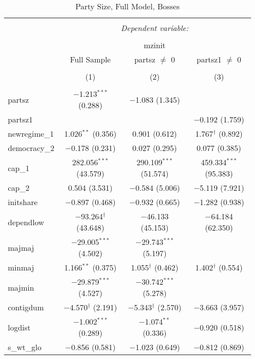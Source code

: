 
\begin{table}[!htbp] \centering 
  \caption{Party Size, Full Model, Bosses} 
  \label{} 
\begin{tabular}{@{\extracolsep{5pt}}lccc} 
\\[-1.8ex]\hline 
\hline \\[-1.8ex] 
 & \multicolumn{3}{c}{\textit{Dependent variable:}} \\ 
\cline{2-4} 
\\[-1.8ex] & \multicolumn{3}{c}{mzinit} \\ 
 & Full Sample & partsz $\neq$ 0 & partsz1 $\neq$ 0 \\ 
\\[-1.8ex] & (1) & (2) & (3)\\ 
\hline \\[-1.8ex] 
 partsz & $-$1.213$^{***}$ (0.288) & $-$1.083 (1.345) &  \\ 
  partsz1 &  &  & $-$0.192 (1.759) \\ 
  newregime\_1 & 1.026$^{**}$ (0.356) & 0.901 (0.612) & 1.767$^{\dagger}$ (0.892) \\ 
  democracy\_2 & $-$0.178 (0.231) & 0.027 (0.295) & 0.077 (0.385) \\ 
  cap\_1 & 282.056$^{***}$ (43.579) & 290.109$^{***}$ (51.574) & 459.334$^{***}$ (95.383) \\ 
  cap\_2 & 0.504 (3.531) & $-$0.584 (5.006) & $-$5.119 (7.921) \\ 
  initshare & $-$0.897 (0.468) & $-$0.932 (0.665) & $-$1.282 (0.938) \\ 
  dependlow & $-$93.264$^{\dagger}$ (43.648) & $-$46.133 (45.153) & $-$64.184 (62.350) \\ 
  majmaj & $-$29.005$^{***}$ (4.502) & $-$29.743$^{***}$ (5.197) &  \\ 
  minmaj & 1.166$^{**}$ (0.375) & 1.055$^{\dagger}$ (0.462) & 1.402$^{\dagger}$ (0.554) \\ 
  majmin & $-$29.879$^{***}$ (4.527) & $-$30.742$^{***}$ (5.278) &  \\ 
  contigdum & $-$4.570$^{\dagger}$ (2.191) & $-$5.343$^{\dagger}$ (2.570) & $-$3.663 (3.957) \\ 
  logdist & $-$1.002$^{***}$ (0.289) & $-$1.074$^{**}$ (0.336) & $-$0.920 (0.518) \\ 
  s\_wt\_glo & $-$0.856 (0.581) & $-$1.023 (0.649) & $-$0.812 (0.869) \\ 

\end{tabular}
\end{table}
